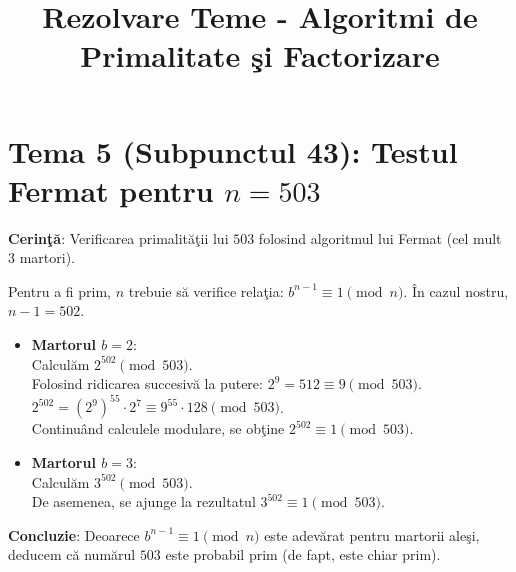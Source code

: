 \documentclass[12pt, a4paper]{article}
\title{Rezolvare Teme - Algoritmi de Primalitate \c{s}i Factorizare}
\author{}
\date{}
\begin{document}
\maketitle
\section*{Tema 5 (Subpunctul 43): Testul Fermat pentru $n = 503$}

\textbf{Cerin\c{t}\u{a}}: Verificarea primalit\u{a}\c{t}ii lui $503$ folosind algoritmul lui Fermat (cel mult 3 martori).

Pentru a fi prim, $n$ trebuie s\u{a} verifice rela\c{t}ia: $b^{n-1} \equiv 1 \pmod n$. \^{I}n cazul nostru, $n-1 = 502$.

\begin{itemize}
    \item \textbf{Martorul $b = 2$}: \\
    Calcul\u{a}m $2^{502} \pmod{503}$. \\
    Folosind ridicarea succesiv\u{a} la putere: $2^9 = 512 \equiv 9 \pmod{503}$. \\
    $2^{502} = (2^9)^{55} \cdot 2^7 \equiv 9^{55} \cdot 128 \pmod{503}$. \\
    Continu\^{a}nd calculele modulare, se ob\c{t}ine $2^{502} \equiv 1 \pmod{503}$.
    
    \item \textbf{Martorul $b = 3$}: \\
    Calcul\u{a}m $3^{502} \pmod{503}$. \\
    De asemenea, se ajunge la rezultatul $3^{502} \equiv 1 \pmod{503}$.
\end{itemize}

\textbf{Concluzie}: Deoarece $b^{n-1} \equiv 1 \pmod n$ este adev\u{a}rat pentru martorii ale\c{s}i, deducem c\u{a} num\u{a}rul $503$ este probabil prim (de fapt, este chiar prim).
\end{document}
